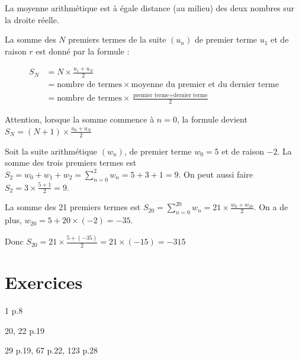 \documentclass[10pt,a4paper,openany,twoside]{book}
\begin{document}
\begin{prop}{}{}
	La moyenne arithmétique est à égale distance (au milieu) des deux nombres sur la droite réelle.

	\begin{center}
	\end{center}

\end{prop}


\begin{prop}{}{}
La somme des $N$ premiers termes de la suite $(u_n)$ de premier terme $u_1$ et de raison $r$ est donné par la formule :

\begin{align*}
	S_N
	&=N\times \frac{u_1+u_N}{2}\\
	&= \text{nombre de termes} \times \text{moyenne du premier et du dernier terme}\\
	&= \text{nombre de termes} \times\frac{\text{premier terme}+\text{dernier terme}}{2}
\end{align*}
\end{prop}

\begin{rem}{}{}
	Attention, lorsque la somme commence à $n=0$, la formule devient $S_N = (N+1)\times \frac{u_0+u_N}{2} $
\end{rem}

\begin{ex}{}{}
	Soit la suite arithmétique $(w_n)$, de premier terme $w_0=5$ et de raison $-2$.
	La somme des trois premiers termes est $S_2 = w_0 + w_1 + w_2 = \sum_{n=0}^{2} w_n = 5 + 3 + 1 = 9$.
	On peut aussi faire $S_2 = 3 \times \frac{5+1}{2} = 9$.

	La somme des 21 premiers termes est $S_{20} =\sum_{n=0}^{20} w_n= 21 \times \frac{w_0+w_{20}}{2}$. On a de plus, $w_{20}=5+20\times(-2)=-35$.

	Donc $S_{20} = 21 \times \frac{5+(-35)}{2} = 21\times(-15) = -315$
\end{ex}

\section*{Exercices}
		\begin{bookact}{1 p.8}\end{bookact}
		\begin{bookexos}{20, 22 p.19}\end{bookexos}
		\begin{bookexos}{29 p.19, 67 p.22, 123 p.28 \train}\end{bookexos}
\end{document}
